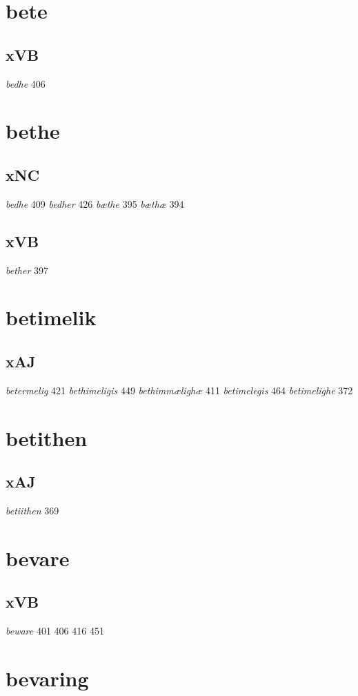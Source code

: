 \documentclass[a4paper,twocolumn]{article}
\begin{document}
\section{bete}
\label{sec:org67885ec}
\subsection{xVB}
\label{sec:orgc008ec6}
\emph{bedhe} 406 
\section{bethe}
\label{sec:orgad28413}
\subsection{xNC}
\label{sec:org85aa4a7}
\emph{bedhe} 409 \emph{bedher} 426 \emph{bæthe} 395 \emph{bæthæ} 394 
\subsection{xVB}
\label{sec:orgaf6bb83}
\emph{bether} 397 
\section{betimelik}
\label{sec:orga074de8}
\subsection{xAJ}
\label{sec:orgf76e2fe}
\emph{betermelig} 421 \emph{bethimeligis} 449 \emph{bethimmælighæ} 411 \emph{betimelegis} 464 \emph{betimelighe} 372 
\section{betithen}
\label{sec:orgc205090}
\subsection{xAJ}
\label{sec:org32ac361}
\emph{betiithen} 369 
\section{bevare}
\label{sec:org5ecdfd1}
\subsection{xVB}
\label{sec:orga617c8f}
\emph{beware} 401 406 416 451 
\section{bevaring}
\label{sec:orgdf2c765}
\end{document}
